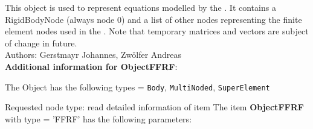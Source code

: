 %
\newpage

\label{sec:item:ObjectFFRF}
This object is used to represent equations modelled by the . It contains a RigidBodyNode (always node 0) and a list of other nodes representing the finite element nodes used in the . Note that temporary matrices and vectors are subject of change in future.\vspace{12pt}
 \\\noindent Authors: Gerstmayr Johannes, Zw\"olfer Andreas
\vspace{12pt}
 \\{\bf Additional information for ObjectFFRF}:
\bi
  \item The Object has the following types = \texttt{Body}, \texttt{MultiNoded}, \texttt{SuperElement}
  \item Requested node type: read detailed information of item
\ei
\vspace{12pt} \noindent The item {\bf ObjectFFRF} with type = 'FFRF' has the following parameters:\vspace{-1cm}\\ 
